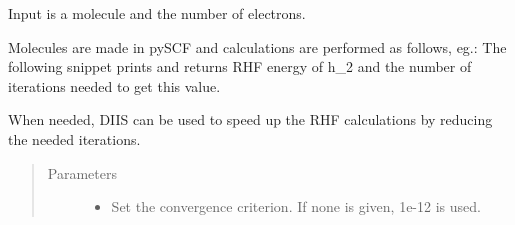 \documentclass[letterpaper,10pt,english]{sphinxmanual}
\begin{document}
\begin{fulllineitems}
\label{\detokenize{RHF:hf.HartreeFock.RHF.MF}}
Input is a molecule and the number of electrons.

Molecules are made in pySCF and calculations are performed as follows, eg.:
The following snippet prints and returns RHF energy of h\_2
and the number of iterations needed to get this value.

\begin{sphinxVerbatim}[commandchars=\\\{\}]
   
          
   
\end{sphinxVerbatim}

\begin{fulllineitems}
\label{\detokenize{RHF:hf.HartreeFock.RHF.MF.diis}}
When needed, DIIS can be used to speed up the RHF calculations by reducing the needed iterations.
\begin{quote}\begin{description}
\item[{Parameters}] \leavevmode\begin{itemize}
\item {} 
 \textendash{} Set the convergence criterion. If none is given, 1e-12 is used.


\end{itemize}
\end{description}
\end{quote}
\end{fulllineitems}
\end{fulllineitems}
\end{document}
